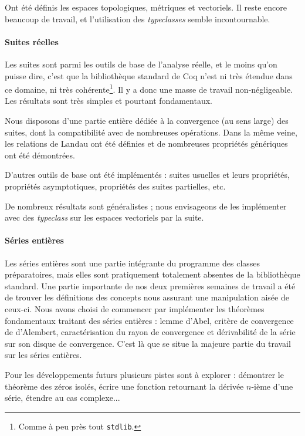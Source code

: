 \documentclass[a4paper,10pt]{article}
\newcommand{\coqcode}[1]{\texttt{#1}}
\begin{document}
Ont été définis les espaces topologiques, métriques et vectoriels. Il reste encore beaucoup de travail, et l'utilisation des \emph{typeclasses} semble incontournable.

\paragraph{Suites réelles}

Les suites sont parmi les outils de base de l'analyse réelle, et le moins qu'on puisse dire, c'est que la bibliothèque standard de Coq n'est ni très étendue dans ce domaine, ni très cohérente\footnote{Comme à peu près tout \coqcode{stdlib}.}. Il y a donc une masse de travail non-négligeable. Les résultats sont très simples et pourtant fondamentaux.

Nous disposons d'une partie entière dédiée à la convergence (au sens large) des suites, dont la compatibilité avec de nombreuses opérations. Dans la même veine, les relations de Landau ont été définies et de nombreuses propriétés génériques ont été démontrées.

D'autres outils de base ont été implémentés : suites usuelles et leurs propriétés, propriétés asymptotiques, propriétés des suites partielles, etc.

De nombreux résultats sont généralistes ; nous envisageons de les implé\-menter avec des \emph{typeclass} sur les espaces vectoriels par la suite.

\paragraph{Séries entières}

Les séries entières sont une partie intégrante du programme des classes préparatoires, mais elles sont pratiquement totalement absentes de la bibliothèque standard. Une partie importante de nos deux premières semaines de travail a été de trouver les définitions des concepts nous assurant une manipulation aisée de ceux-ci. Nous avons choisi de commencer par implémenter les théorèmes fondamentaux traitant des séries entières : lemme d'Abel, critère de convergence de d'Alembert, caractérisation du rayon de convergence et dériva\-bilité de la série sur son disque de convergence. C'est là que se situe la majeure partie du travail sur les séries entières.

Pour les développements futurs plusieurs pistes sont à explorer : démontrer le théorème des zéros isolés, écrire une fonction retournant la dérivée $n$-ième d'une série, étendre au cas complexe...
\end{document}

